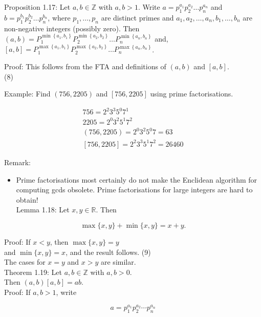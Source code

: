 \documentclass[10pt]{article}
\begin{document}
Proposition 1.17: Let $a, b \in \mathbb{Z}$ with $a, b>1$. Write $a=p_{1}^{a_{1}} p_{2}^{a_{2}} \ldots p_{n}^{a_{n}}$ and $b=p_{1}^{b_{1}} p_{2}^{b_{2}} \ldots p_{n}^{b_{n}}$, where $p_{1}, \ldots, p_{n}$ are distinct primes and $a_{1}, a_{2}, \ldots, a_{n}, b_{1}, \ldots, b_{n}$ are non-negative integers (possibly zero). Then\\
$(a, b)=P_{1}^{\min \left\{a_{1}, b_{1}\right\}} P_{2}^{\min \left\{a_{2}, b_{2}\right\}} \ldots P_{n}^{\min \left\{a_{n}, b_{n}\right\}}$ and,\\
$[a, b]=P_{1}^{\max \left\{a_{1}, b_{1}\right\}} P_{2}^{\max \left\{a_{2}, b_{2}\right\}} \ldots P_{n}^{\max \left\{a_{n}, b_{n}\right\}}$.

Proof: This follows from the FTA and definitions of $(a, b)$ and $[a, b]$.\\
(8)

Example: Find $(756,2205)$ and $[756,2205]$ using prime factorisations.

$$
\begin{gathered}
756=2^{2} 3^{3} 5^{0} 7^{1} \\
2205=2^{0} 3^{2} 5^{1} 7^{2} \\
(756,2205)=2^{0} 3^{2} 5^{0} 7=63 \\
{[756,2205]=2^{2} 3^{3} 5^{1} 7^{2}=26460}
\end{gathered}
$$

Remark:

\begin{itemize}
  \item Prime factorisations most certainly do not make the Enclidean algorithm for computing gcds obsolete. Prime factorisations for large integers are hard to obtain!\\
Lemma 1.18: Let $x, y \in \mathbb{R}$. Then
\end{itemize}

$$
\max \{x, y\}+\min \{x, y\}=x+y .
$$

Proof: If $x<y$, then $\max \{x, y\}=y$\\
and $\min \{x, y\}=x$, and the result follows. (9)\\
The cases for $x=y$ and $x>y$ are similar.\\
Theorem 1.19: Let $a, b \in \mathbb{Z}$ with $a, b>0$.\\
Then $(a, b)[a, b]=a b$.\\
Proof: If $a, b>1$, write

$$
a=p_{1}^{a_{1}} p_{2}^{a_{2}} \cdots p_{n}^{a_{n}}
$$
\end{document}
